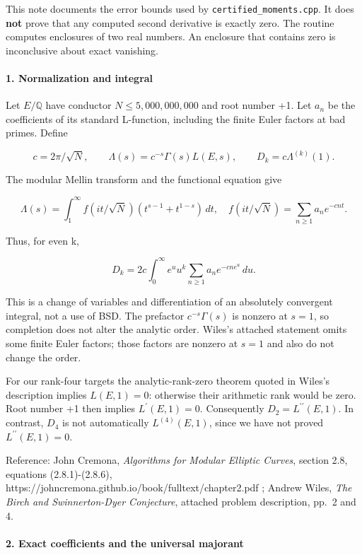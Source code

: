 \documentclass[11pt]{article}
\begin{document}
This note documents the error bounds used by \nolinkurl{certified_moments.cpp}. It does \textbf{not} prove that any computed second derivative is exactly zero. The routine computes enclosures of two real numbers. An enclosure that contains zero is inconclusive about exact vanishing.

\paragraph{1. Normalization and integral}

Let \(E/\mathbb Q\) have conductor \(N\le5{,}000{,}000{,}000\) and root number +1. Let \(a_n\) be the coefficients of its standard L-function, including the finite Euler factors at bad primes. Define

\[
c=2\pi/\sqrt N,\qquad \Lambda(s)=c^{-s}\Gamma(s)L(E,s),\qquad D_k=c\Lambda^{(k)}(1).
\]

The modular Mellin transform and the functional equation give

\[
\Lambda(s)=\int_1^\infty f(it/\sqrt N)(t^{s-1}+t^{1-s})\,dt,
\quad f(it/\sqrt N)=\sum_{n\ge1}a_n e^{-cnt}.
\]

Thus, for even k,

\[
D_k=2c\int_0^\infty e^u u^k\sum_{n\ge1}a_n e^{-cn e^u}\,du.
\]

This is a change of variables and differentiation of an absolutely convergent integral, not a use of BSD. The prefactor \(c^{-s}\Gamma(s)\) is nonzero at \(s=1\), so completion does not alter the analytic order. Wiles's attached statement omits some finite Euler factors; those factors are nonzero at \(s=1\) and also do not change the order.

For our rank-four targets the analytic-rank-zero theorem quoted in Wiles's description implies \(L(E,1)=0\): otherwise their arithmetic rank would be zero. Root number +1 then implies \(L^{\prime}(E,1)=0\). Consequently \(D_2=L^{\prime\prime}(E,1)\). In contrast, \(D_4\) is not automatically \(L^{(4)}(E,1)\), since we have not proved \(L^{\prime\prime}(E,1)=0\).

Reference: John Cremona, \emph{Algorithms for Modular Elliptic Curves}, section 2.8, equations (2.8.1)-(2.8.6), https://johncremona.github.io/book/fulltext/chapter2.pdf ; Andrew Wiles, \emph{The Birch and Swinnerton-Dyer Conjecture}, attached problem description, pp.~2 and 4.

\paragraph{2. Exact coefficients and the universal majorant}
\end{document}
